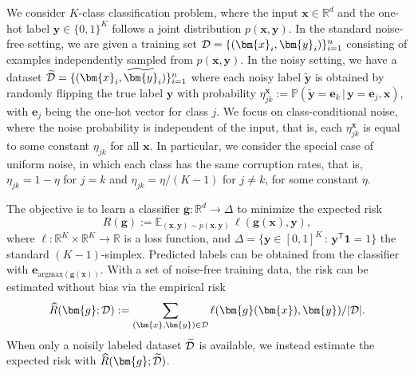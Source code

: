 \documentclass[letterpaper]{article} %
\newcommand{\R}{{\mathbb{R}}}
\newcommand{\Em}{{\mathbb{E}}}
\newcommand{\Pm}{{\mathbb{P}}}
\newcommand{\bx}{{\bm{x}}}
\newcommand{\bg}{{\bm{g}}}
\newcommand{\by}{{\bm{y}}}
\newcommand{\be}{{\bm{e}}}
\newcommand{\T}{{\mathsf{T}}}
\newcommand{\gvn}{\,|\,}
\newcommand{\cD}{{\cal{D}}}
\newcommand{\simplex}{\Delta}
\newcommand{\argmax}{\mathrm{argmax}}
\begin{document}
We consider $K$-class classification problem, where the input
$\bx\in\R^d$ and the one-hot label $\by\in\{0,1\}^K$ follows a joint
distribution $p(\bx,\by)$.
In the standard noise-free setting, we are given a training set
$\cD=\{(\bx_i,\by_i)\}_{i=1}^n$ consisting of examples independently sampled
from $p(\bx, \by)$.
In the noisy setting, we have a dataset
$\widetilde{\cD}=\{(\bx_i,\widetilde{\by}_i)\}_{i=1}^n$
where each noisy label $\widetilde{\by}$ is obtained by randomly flipping the
true label $\by$ with probability
$\eta_{jk}^{\bx} := \Pm(\widetilde{\by} = \be_k\gvn \by = \be_j,\bx)$,
with $\be_{j}$ being the one-hot vector for class $j$.
We focus on class-conditional noise, where
the noise probability is independent of the input, that is, each
$\eta_{jk}^{\bx}$ is equal to some constant $\eta_{jk}$ for all $\bx$.
In particular, we consider the special case of uniform noise, in which each
class has the same corruption rates, that is, $\eta_{jk}=1-\eta$ for $j=k$ and
$\eta_{jk}=\eta/(K-1)$ for $j\ne k$, for some constant $\eta$.

The objective is to learn a classifier $\bg:\R^d\to \simplex$ to minimize the expected risk
\[
    R(\bg) := \Em_{(\bx,\by)\sim p(\bx,\by)}\, \ell(\bg(\bx),\by),
\]
where $\ell:\R^{K}\times \R^K\to \R$ is a loss function, and
$\simplex = \{\by\in [0,1]^K\,:\, \by^\T\bm{1}=1\}$ the standard
$(K-1)$-simplex.
Predicted labels can be obtained from the classifier with $\be_{\argmax(\bg(\bx))}$.
With a set of noise-free training data, the risk can be estimated without bias via the empirical risk
\[
    \widehat{R}(\bg;\cD) := \sum_{(\bx,\by)\in\cD} \ell(\bg(\bx),\by) / |\cD|.
\]
When only a noisily labeled dataset $\widetilde{\cD}$ is available, we instead
estimate the expected risk with $\widehat{R}(\bg;\widetilde{\cD})$.
\end{document}
